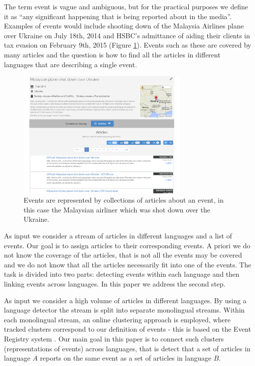 \documentclass[twoside,11pt]{article}
\begin{document}
The term event is vague and ambiguous, but for the practical purposes we define it as ``any significant happening that is being reported about in the media''. Examples of events would include shooting down of the Malaysia Airlines plane over Ukraine on July 18th, 2014 and HSBC's admittance of aiding their clients in tax evasion on February 9th, 2015 (Figure \ref{fig:event2}). Events such as these are covered by many articles and the question is how to find all the articles in different languages that are describing a single event.

\begin{figure}
\centering
\includegraphics[width=0.75\textwidth]{events2.png}
\caption{\label{fig:event2} Events are represented by collections of articles about an event, in this case the Malaysian airliner which was shot down over the Ukraine.}
\end{figure}

As input we consider a stream of articles in different languages and a list of events. Our goal is to assign articles to their corresponding events. A priori we do not know the coverage of the articles, that is not all the events may be covered and we do not know that all the articles necessarily fit into one of the events. The task is divided into two parts: detecting events within each language and then linking events across languages. In this paper we address the second step.

As input we consider a high volume of articles in different languages. By using a language detector the stream is split into separate monolingual streams. Within each monolingual stream, an online clustering approach is employed, where tracked clusters correspond to our definition of events - this is based on the Event Registry system . Our main goal in this paper is to connect such clusters (representations of events) across languages, that is detect that a set of articles in language $A$ reports on the same event as a set of articles in language $B$.
\end{document}
